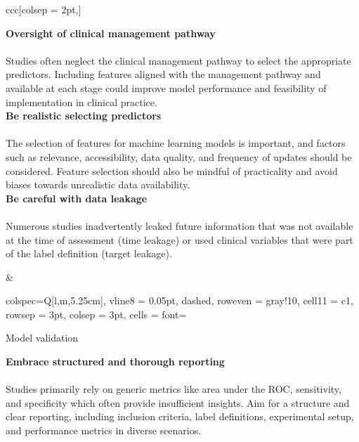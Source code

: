 \begin{table*}[h!]
\begin{tblr}{ccc}[colsep = 2pt,]
\begin{tblr}[T]
           {\textbf{Oversight of clinical management pathway} \\ \vspace{0.1cm} \\ Studies often neglect the clinical management pathway to select the appropriate predictors. Including features aligned with the management pathway and available at each stage could improve model performance and feasibility of implementation in clinical practice.} \\
            
           {\textbf{Be realistic selecting predictors} \\ \vspace{0.1cm} \\ The selection of features for machine learning models is important, and factors such as relevance, accessibility, data quality, and frequency of updates should be considered. Feature selection should also be mindful of practicality and avoid biases towards unrealistic data availability.} \\
            
           {\textbf{Be careful with data leakage} \\ \vspace{0.1cm} \\ Numerous studies inadvertently leaked future information that was not available at the time of assessment (time leakage) or used clinical variables that were part of the label definition (target leakage).} \\

           \bottomrule
           
        \end{tblr}
         
         &

    \begin{tblr}[T]{
            colspec={Q[l,m,5.25cm]},
            vline{8} = {0.05pt, dashed},
            row{even} = {gray!10},
            cell{1}{1} = {c1},
            rowsep = 3pt,
            colsep = 3pt,
            cells = {font=\fontsize{7}{8}\linespread{1.00}\selectfont}
        }

           \midrule
            Model validation \\
           \midrule

           {\textbf{Embrace structured and thorough reporting} \\ \vspace{0.1cm} \\ Studies primarily rely on generic metrics like area under the ROC, sensitivity, and specificity which often provide insufficient insights. Aim for a structure and clear reporting, including inclusion criteria, label definitions, experimental setup, and performance metrics in diverse scenarios.} \\
    

\end{tblr}
\end{tblr}
\end{table*}
